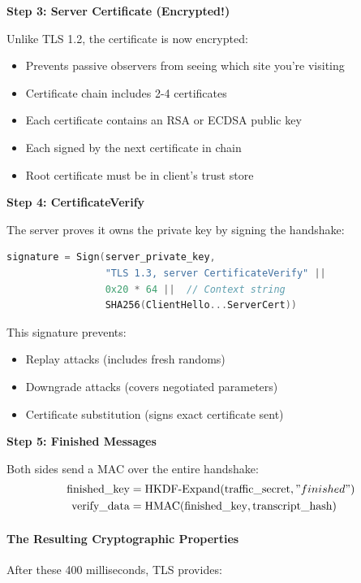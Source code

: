 \documentclass[11pt,a4paper]{article}
\begin{document}
\textbf{Step 3: Server Certificate (Encrypted!)}

Unlike TLS 1.2, the certificate is now encrypted:
\begin{itemize}
    \item Prevents passive observers from seeing which site you're visiting
    \item Certificate chain includes 2-4 certificates
    \item Each certificate contains an RSA or ECDSA public key
    \item Each signed by the next certificate in chain
    \item Root certificate must be in client's trust store
\end{itemize}

\textbf{Step 4: CertificateVerify}

The server proves it owns the private key by signing the handshake:
\begin{lstlisting}[language=C]
signature = Sign(server_private_key, 
                 "TLS 1.3, server CertificateVerify" ||
                 0x20 * 64 ||  // Context string
                 SHA256(ClientHello...ServerCert))
\end{lstlisting}

This signature prevents:
\begin{itemize}
    \item Replay attacks (includes fresh randoms)
    \item Downgrade attacks (covers negotiated parameters)
    \item Certificate substitution (signs exact certificate sent)
\end{itemize}

\textbf{Step 5: Finished Messages}

Both sides send a MAC over the entire handshake:
\begin{align}
\text{finished\_key} &= \text{HKDF-Expand}(\text{traffic\_secret}, "finished")\\
\text{verify\_data} &= \text{HMAC}(\text{finished\_key}, \text{transcript\_hash})
\end{align}

\paragraph{The Resulting Cryptographic Properties}

After these 400 milliseconds, TLS provides:
\end{document}
